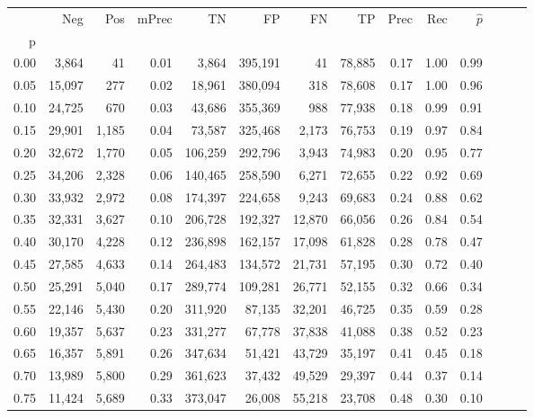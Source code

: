 \begin{tabular}{rrrrrrrrrrrrrr}
\toprule
{} &     Neg &    Pos & mPrec &       TN &       FP &      FN &      TP &  Prec &   Rec & $\hat{p}$ \\
p    &         &        &       &          &          &         &         &       &       &           \\
\midrule
0.00 &   3,864 &     41 &  0.01 &    3,864 &  395,191 &      41 &  78,885 &  0.17 &  1.00 &      0.99 \\
0.05 &  15,097 &    277 &  0.02 &   18,961 &  380,094 &     318 &  78,608 &  0.17 &  1.00 &      0.96 \\
0.10 &  24,725 &    670 &  0.03 &   43,686 &  355,369 &     988 &  77,938 &  0.18 &  0.99 &      0.91 \\
0.15 &  29,901 &  1,185 &  0.04 &   73,587 &  325,468 &   2,173 &  76,753 &  0.19 &  0.97 &      0.84 \\
0.20 &  32,672 &  1,770 &  0.05 &  106,259 &  292,796 &   3,943 &  74,983 &  0.20 &  0.95 &      0.77 \\
0.25 &  34,206 &  2,328 &  0.06 &  140,465 &  258,590 &   6,271 &  72,655 &  0.22 &  0.92 &      0.69 \\
0.30 &  33,932 &  2,972 &  0.08 &  174,397 &  224,658 &   9,243 &  69,683 &  0.24 &  0.88 &      0.62 \\
0.35 &  32,331 &  3,627 &  0.10 &  206,728 &  192,327 &  12,870 &  66,056 &  0.26 &  0.84 &      0.54 \\
0.40 &  30,170 &  4,228 &  0.12 &  236,898 &  162,157 &  17,098 &  61,828 &  0.28 &  0.78 &      0.47 \\
0.45 &  27,585 &  4,633 &  0.14 &  264,483 &  134,572 &  21,731 &  57,195 &  0.30 &  0.72 &      0.40 \\
0.50 &  25,291 &  5,040 &  0.17 &  289,774 &  109,281 &  26,771 &  52,155 &  0.32 &  0.66 &      0.34 \\
0.55 &  22,146 &  5,430 &  0.20 &  311,920 &   87,135 &  32,201 &  46,725 &  0.35 &  0.59 &      0.28 \\
0.60 &  19,357 &  5,637 &  0.23 &  331,277 &   67,778 &  37,838 &  41,088 &  0.38 &  0.52 &      0.23 \\
0.65 &  16,357 &  5,891 &  0.26 &  347,634 &   51,421 &  43,729 &  35,197 &  0.41 &  0.45 &      0.18 \\
0.70 &  13,989 &  5,800 &  0.29 &  361,623 &   37,432 &  49,529 &  29,397 &  0.44 &  0.37 &      0.14 \\
0.75 &  11,424 &  5,689 &  0.33 &  373,047 &   26,008 &  55,218 &  23,708 &  0.48 &  0.30 &      0.10 \\

\end{tabular}
